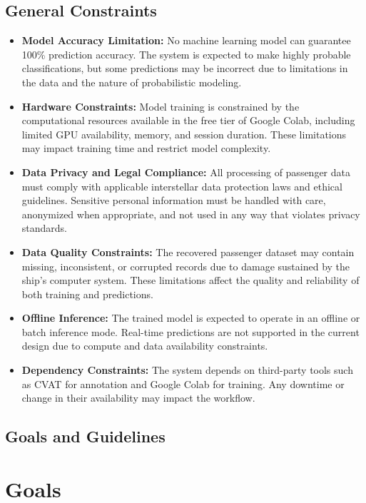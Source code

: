 \documentclass[15pt]{article}
\begin{document}
\subsection{General Constraints}
\begin{itemize}
    \item \textbf{Model Accuracy Limitation:} No machine learning model can guarantee 100\% prediction accuracy. The system is expected to make highly probable classifications, but some predictions may be incorrect due to limitations in the data and the nature of probabilistic modeling.
    \item \textbf{Hardware Constraints:} Model training is constrained by the computational resources available in the free tier of Google Colab, including limited GPU availability, memory, and session duration. These limitations may impact training time and restrict model complexity.
    \item \textbf{Data Privacy and Legal Compliance:} All processing of passenger data must comply with applicable interstellar data protection laws and ethical guidelines. Sensitive personal information must be handled with care, anonymized when appropriate, and not used in any way that violates privacy standards.
    \item \textbf{Data Quality Constraints:} The recovered passenger dataset may contain missing, inconsistent, or corrupted records due to damage sustained by the ship’s computer system. These limitations affect the quality and reliability of both training and predictions.
    \item \textbf{Offline Inference:} The trained model is expected to operate in an offline or batch inference mode. Real-time predictions are not supported in the current design due to compute and data availability constraints.
    \item \textbf{Dependency Constraints:} The system depends on third-party tools such as CVAT for annotation and Google Colab for training. Any downtime or change in their availability may impact the workflow.
\end{itemize}

\subsection{Goals and Guidelines}
\section{Goals}
\end{document}
